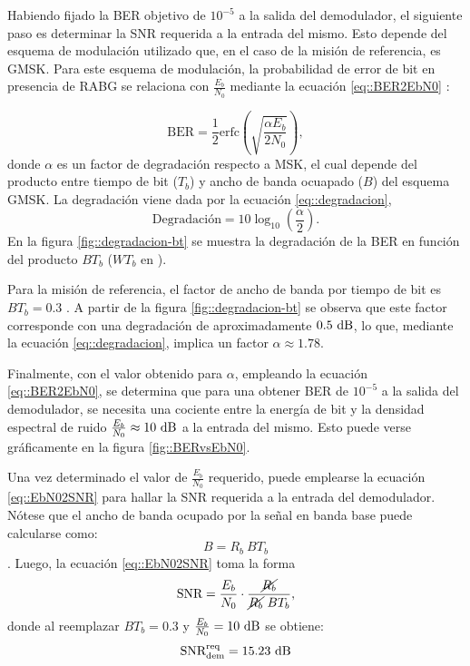 \documentclass[../../main.tex]{subfiles}
\begin{document}
Habiendo fijado la BER objetivo de $10^{-5}$ a la salida del demodulador, el siguiente paso es determinar la SNR requerida a la entrada del mismo. Esto depende del esquema de modulación utilizado que, en el caso de la misión de referencia, es GMSK. Para este esquema de modulación, la probabilidad de error de bit en presencia de RABG se relaciona con $\frac{E_b}{N_0}$ mediante la ecuación \ref{eq::BER2EbN0} \cite{haykin}:

\begin{equation}
    \textrm{BER} = \frac{1}{2} \textrm{erfc}\left(\sqrt{\frac{\alpha E_b}{2 N_0}}\right),
    \label{eq::BER2EbN0}
\end{equation}
donde $\alpha$ es un factor de degradación respecto a MSK, el cual depende del producto entre tiempo de bit ($T_b$) y ancho de banda ocuapado ($B$) del esquema GMSK. La degradación viene dada por la ecuación \ref{eq::degradacion},
\begin{equation}
    \textrm{Degradación} = 10 \log_{10}{\left(\frac{\alpha}{2}\right).}
    \label{eq::degradacion}
\end{equation}
En la figura \ref{fig::degradacion-bt} se muestra la degradación de la BER en función del producto $B T_b$ ($W T_b$ en ).

Para la misión de referencia, el factor de ancho de banda por tiempo de bit es $BT_b = 0.3$ \cite{BEESAT-9}. A partir de la figura \ref{fig::degradacion-bt} se observa que este factor corresponde con una degradación de aproximadamente $0.5~\textrm{dB}$, lo que, mediante la ecuación \ref{eq::degradacion}, implica un factor $\alpha \approx 1.78$.

Finalmente, con el valor obtenido para $\alpha$, empleando la ecuación \ref{eq::BER2EbN0}, se determina que para una obtener BER de $10^{-5}$ a la salida del demodulador, se necesita una cociente entre la energía de bit y la densidad espectral de ruido $\frac{E_b}{N_0} \approx 10~\textrm{dB}$ a la entrada del mismo. Esto puede verse gráficamente en la figura \ref{fig::BERvsEbN0}.

Una vez determinado el valor de $\frac{E_b}{N_0}$ requerido, puede emplearse la ecuación \ref{eq::EbN02SNR} para hallar la SNR requerida a la entrada del demodulador. Nótese que el ancho de banda ocupado por la señal en banda base puede calcularse como:
\[B = R_b \ B T_b\].
Luego, la ecuación \ref{eq::EbN02SNR} toma la forma
\[\textrm{SNR} = \frac{E_b}{N_0} \cdot \frac{\cancel{R_b}}{\cancel{R_b} \ B T_b},\] donde al reemplazar $BT_b = 0.3$ y $\frac{E_b}{N_0} = 10~\textrm{dB}$ se obtiene:
\begin{equation}
    \textrm{SNR}^\textrm{req}_\textrm{dem} = 15.23~\textrm{dB}
    \label{eq::SNR-req}
\end{equation}
\end{document}
